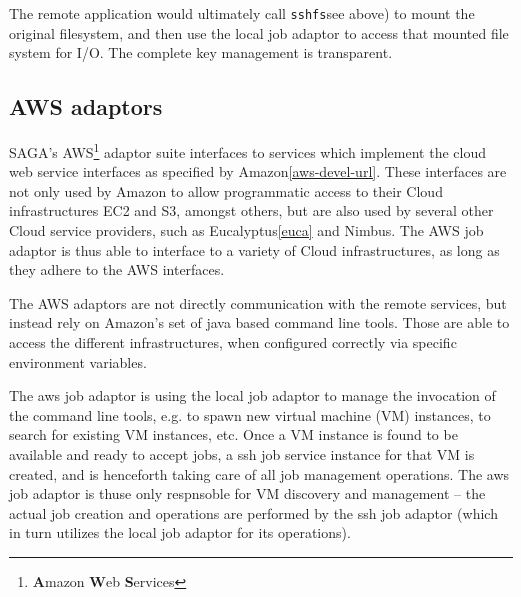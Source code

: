 \documentclass[conference,final]{IEEEtran}
\newcommand{\B}[1]{\textbf{#1}}
\newcommand{\sshfs}[1]{\texttt{sshfs}}
\begin{document}





   The remote application would ultimately call \sshfs (see above) to
   mount the original filesystem, and then use the local job adaptor
   to access that mounted file system for I/O.  The complete key
   management is transparent.

 \subsection{AWS adaptors}

 SAGA's AWS\footnote{\B{A}mazon \B{W}eb \B{S}ervices} adaptor suite
 interfaces to services which implement the cloud web service
 interfaces as specified by Amazon\ref{aws-devel-url}.  These
 interfaces are not only used by Amazon to allow programmatic access
 to their Cloud infrastructures EC2 and S3, amongst others, but are
 also used by several other Cloud service providers, such as
 Eucalyptus\ref{euca} and Nimbus.  The AWS job adaptor is thus able to
 interface to a variety of Cloud infrastructures, as long as they
 adhere to the AWS interfaces.

  The AWS adaptors are not directly communication with the remote
  services, but instead rely on Amazon's set of java based command
  line tools.  Those are able to access the different infrastructures,
  when configured correctly via specific environment variables.

  The aws job adaptor is using the local job adaptor to manage the
  invocation of the command line tools, e.g. to spawn new virtual
  machine (VM) instances, to search for existing VM instances, etc.
  Once a VM instance is found to be available and ready to accept
  jobs, a ssh job service instance for that VM is created, and is
  henceforth taking care of all job management operations.  The aws
  job adaptor is thuse only respnsoble for VM discovery and management
  -- the actual job creation and operations are performed by the ssh
  job adaptor (which in turn utilizes the local job adaptor for its
  operations).
\end{document}
